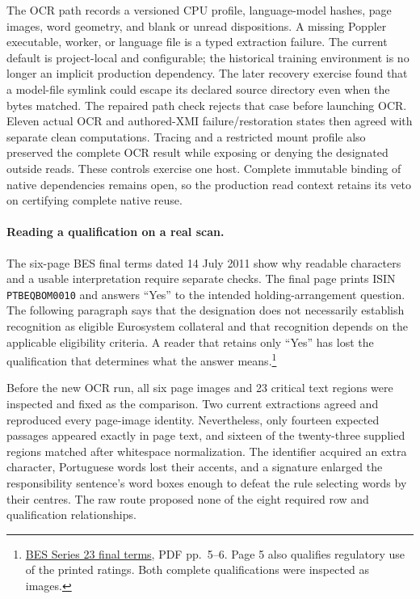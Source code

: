 The OCR path records a versioned CPU profile, language-model hashes, page images,
word geometry, and blank or unread dispositions.  A missing Poppler executable,
worker, or language file is a typed extraction failure.  The current default
is project-local and configurable; the historical training environment is no
longer an implicit production dependency.  The later recovery exercise found
that a model-file symlink could escape its declared source directory even when
the bytes matched.  The repaired path check rejects that case before launching
OCR.  Eleven actual OCR and authored-XMI failure/restoration states then agreed
with separate clean computations.  Tracing and a restricted mount profile also
preserved the complete OCR result while exposing or denying the designated
outside reads.  These controls exercise one host.  Complete immutable binding
of native dependencies remains open, so the production read context retains
its veto on certifying complete native reuse.

\paragraph{Reading a qualification on a real scan.}
The six-page BES final terms dated 14 July 2011 show why readable characters
and a usable interpretation require separate checks.  The final page prints
ISIN \texttt{PTBEQBOM0010} and answers ``Yes'' to the intended holding-arrangement
question.  The following paragraph says that the designation does not
necessarily establish recognition as eligible Eurosystem collateral and that
recognition depends on the applicable eligibility criteria.  A reader that
retains only ``Yes'' has lost the qualification that determines what the answer
means.\footnote{\href{../prospectus/corner-cases-2026-10-04/sources/jur-more-bes-1315263/source.pdf}
{BES Series 23 final terms}, PDF pp.~5--6.  Page 5 also qualifies regulatory use
of the printed ratings.  Both complete qualifications were inspected as images.}

Before the new OCR run, all six page images and 23 critical text regions were
inspected and fixed as the comparison.  Two current extractions agreed and
reproduced every page-image identity.  Nevertheless, only fourteen expected
passages appeared exactly in page text, and sixteen of the twenty-three
supplied regions matched after whitespace normalization.  The identifier
acquired an extra character, Portuguese words lost their accents, and a
signature enlarged the responsibility sentence's word boxes enough to defeat
the rule selecting words by their centres.  The raw route proposed none of
the eight required row and qualification relationships.

